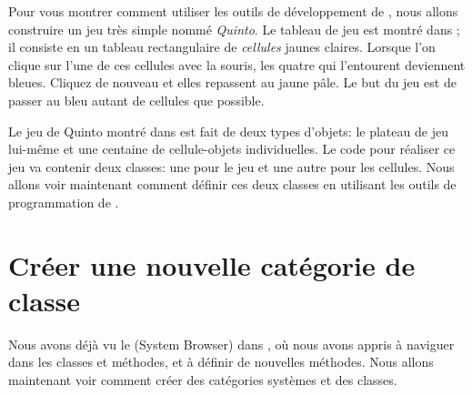 \documentclass[a4paper,10pt,twoside]{book}
\begin{document}
Pour vous montrer comment utiliser les outils de d\'eveloppement de
\sq, nous allons construire un jeu tr\`es simple nomm\'e
\emph{Quinto}.  Le tableau de jeu est montr\'e dans
; il consiste en un tableau rectangulaire de
\emph{cellules} jaunes claires.  Lorsque l'on clique sur l'une de ces
cellules avec la souris, les quatre qui l'entourent deviennent
bleues. Cliquez de nouveau et elles repassent au jaune p\^ale. Le but du 
jeu est de passer au bleu autant de cellules que possible.

Le jeu de Quinto montr\'e dans  est fait de deux types d'objets: le plateau de jeu lui-même et une centaine de cellule-objets individuelles. Le code \sq pour r\'ealiser ce jeu va contenir deux classes: une pour le jeu et une autre pour les cellules.
Nous allons voir maintenant comment d\'efinir ces deux classes en utilisant les outils de programmation de \sq.

\section{Créer une nouvelle catégorie de classe}

Nous avons déjà vu le  (System Browser)
dans , où nous avons appris à naviguer dans les classes
et m\'ethodes, et \`a d\'efinir de nouvelles m\'ethodes.
Nous allons maintenant voir comment cr\'eer des cat\'egories syst\`emes et des classes.

\end{document}
